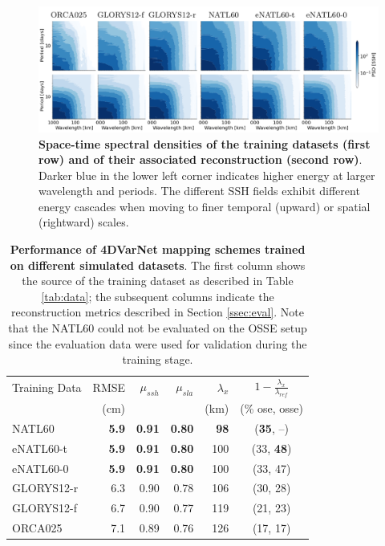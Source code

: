 \begin{bibunit}
\begin{figure}[H]
\small
\begin{center}
\includegraphics[width=\linewidth]{./00_Simulearning/standalone_figures/st_psd.png}
\end{center}

\caption{
\textbf{Space-time spectral densities of the training datasets (first row) and of their associated reconstruction (second row)}. Darker blue in the lower left corner indicates higher energy at larger wavelength and periods. The different SSH fields exhibit different energy cascades when moving to  finer temporal (upward) or spatial (rightward) scales.} \vspace{-5mm}
\label{fig:spacetime_psd}
\end{figure}






\begin{table}[H]
\centering
\begin{tabular}{l||rrrrc}
\toprule
Training Data & RMSE  & $\mu_{ssh}$  & $\mu_{sla}$ & $\lambda_x$ & $1 - \frac{\lambda_x}{\lambda_{ref}}$ \\
 &  (cm) &   &   &  (km) & (\% ose, osse) \\
\midrule
NATL60 & \textbf{5.9}  & \textbf{0.91}  & \textbf{0.80}  & \textbf{98} & (\textbf{35}, --)\\
eNATL60-t & \textbf{5.9}  & \textbf{0.91}  & \textbf{0.80}  & 100 & (33, \textbf{48})\\
eNATL60-0 & \textbf{5.9}  & \textbf{0.91}  & \textbf{0.80}  & 100 & (33, 47)\\
GLORYS12-r & 6.3  & 0.90  & 0.78  & 106  & (30, 28)\\
GLORYS12-f & 6.7  & 0.90  & 0.77  & 119 & (21, 23)\\
ORCA025 & 7.1  & 0.89  & 0.76  & 126 & (17, 17)\\
\bottomrule
\end{tabular}

\caption{\textbf{Performance of 4DVarNet mapping schemes trained on different simulated datasets}. The first column shows the source of the training dataset as described in Table \ref{tab:data}; the subsequent columns indicate the reconstruction metrics described in Section \ref{ssec:eval}. Note that the NATL60 could not be evaluated on the OSSE setup since the evaluation data were used for validation during the training stage.}
\label{tab:res}
\end{table}


\end{bibunit}
